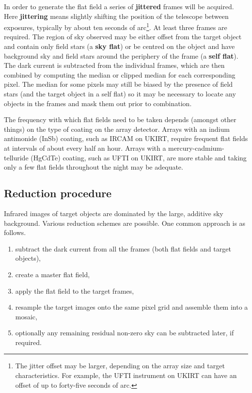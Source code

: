 \documentclass[twoside,11pt]{article}
\begin{document}
\begin{description}
   In order to generate the flat field a series of {\bf jittered} frames
   will be acquired.  Here {\bf jittering} means slightly shifting the
   position of the telescope between exposures, typically by about ten
   seconds of arc\footnote{The jitter offset may be larger, depending on
   the array size and target characteristics.  For example, the UFTI
   instrument on UKIRT can have an offset of up to forty-five seconds of
   arc.}.  At least three frames are required.  The region of sky observed
   may be either offset from the target object and contain only field stars
   (a {\bf sky flat}) or be centred on the object and have background sky
   and field stars around the periphery of the frame (a {\bf self flat}).
   The dark current is subtracted from the individual frames, which are
   then combined by computing the median or clipped median for each
   corresponding pixel.  The median for some pixels may still be biased by
   the presence of field stars (and the target object in a self flat) so
   it may be necessary to locate any objects in the frames and mask them
   out prior to combination.

   The frequency with which flat fields need to be taken depends (amongst
   other things) on the type of coating on the array detector.  Arrays
   with an indium antimonide (InSb) coating, such as IRCAM on UKIRT,
   require frequent flat fields at intervals of about every half an hour.
   Arrays with a mercury-cadmium-telluride (HgCdTe) coating, such as
   UFTI on UKIRT, are more stable and taking only a few flat fields
   throughout the night may be adequate.

\end{description}

\subsection{Reduction procedure}

Infrared images of target objects are dominated by the large, additive
sky background.  Various reduction schemes are possible.  One common
approach is as follows.

\begin{enumerate}

  \item subtract the dark current from all the frames (both flat fields
   and target objects),

  \item create a master flat field,

  \item apply the flat field to the target frames,

  \item resample the target images onto the same pixel grid and assemble
   them into a mosaic,

  \item optionally any remaining residual non-zero sky can be subtracted
   later, if required.

\end{enumerate}
\end{document}
